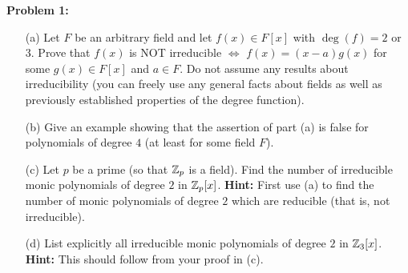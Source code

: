 \documentclass[11pt]{amsart}
\begin{document}
\skv
\bf{Problem 1: }\rm 
\begin{itemize}
\item[(a)] Let $F$ be an arbitrary field and let $f(x)\in F[x]$ with $\deg(f)=2$ or $3$. Prove that $f(x)$ is NOT irreducible $\iff$
$f(x)=(x-a)g(x)$ for some $g(x)\in F[x]$ and $a\in F$. Do not assume any results about irreducibility (you can freely use any general facts about fields as well as previously established properties of the degree function).
\item[(b)] Give an example showing that the assertion of part (a) is false for polynomials of degree $4$ (at least for some field $F$).
\item[(c)] Let $p$ be a prime (so that ${\mathbb Z}_p$ is a field). Find the number of irreducible monic polynomials of degree $2$ in ${\mathbb Z}_p[x]$.
{\bf Hint:} First use (a) to find the number of monic polynomials of degree $2$ which are reducible (that is, not irreducible).
\item[(d)] List explicitly all irreducible monic polynomials of degree $2$ in ${\mathbb Z}_3[x]$. {\bf Hint:} This should follow from your proof in (c).
\end{itemize}
\end{document}

